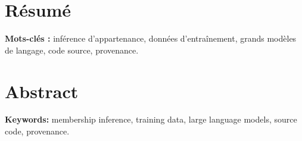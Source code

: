 \section*{Résumé}

\noindent\textbf{Mots-clés :} inférence d'appartenance, données d'entraînement, grands modèles de langage, code source, provenance.

\section*{Abstract}

\noindent\textbf{Keywords:} membership inference, training data, large language models, source code, provenance.
\newpage
